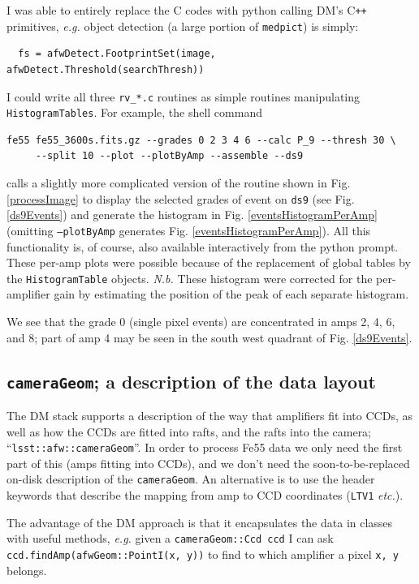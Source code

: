 \documentclass[12pt]{article}
\newcommand{\CPP}{C\texttt{++}\xspace}  %
\begin{document}
I was able to entirely replace the C codes with python calling DM's \CPP primitives, \textit{e.g.}
object detection (a large portion of \texttt{medpict}) is simply:
\begin{lstlisting}
  fs = afwDetect.FootprintSet(image, afwDetect.Threshold(searchThresh))
\end{lstlisting}
I could write all three \texttt{rv\_*.c} routines as simple routines manipulating \texttt{HistogramTables}.
For example, the shell command
\begin{verbatim}
fe55 fe55_3600s.fits.gz --grades 0 2 3 4 6 --calc P_9 --thresh 30 \
     --split 10 --plot --plotByAmp --assemble --ds9
\end{verbatim}
calls a slightly more complicated version of the routine shown in Fig. \ref{processImage} to
display the selected grades of event on \texttt{ds9} (see Fig. \ref{ds9Events}) and generate
the histogram in Fig. \ref{eventsHistogramPerAmp} (omitting \texttt{--plotByAmp} generates
Fig. \ref{eventsHistogramPerAmp}).  All this functionality is, of course, also available
interactively from the python prompt.
These per-amp plots were possible because of the replacement of global tables by the \texttt{HistogramTable}
objects.  \textit{N.b.} These histogram were corrected for the per-amplifier gain by estimating the position
of the peak of each separate histogram.

We see that the grade 0 (single pixel events) are concentrated in amps 2, 4, 6, and 8; part of
amp 4 may be seen in the south west quadrant of Fig. \ref{ds9Events}.

\subsection{\texttt{cameraGeom}; a description of the data layout}

The DM stack supports a description of the way that amplifiers fit into CCDs, as well as how the CCDs are
fitted into rafts, and the rafts into the camera; ``\texttt{lsst::afw::cameraGeom}''.
In order to process Fe55 data we only need the first part
of this (amps fitting into CCDs), and we don't need the soon-to-be-replaced on-disk description of
the \texttt{cameraGeom}.  An alternative is to use the header keywords that describe the mapping
from amp to CCD coordinates (\texttt{LTV1} \textit{etc.}).

The advantage of the DM approach is that it encapsulates the data in classes with useful methods,
\textit{e.g.} given a \texttt{cameraGeom::Ccd ccd} I can ask \texttt{ccd.findAmp(afwGeom::PointI(x, y))}
to find to which amplifier a pixel \texttt{x, y} belongs.
\end{document}
